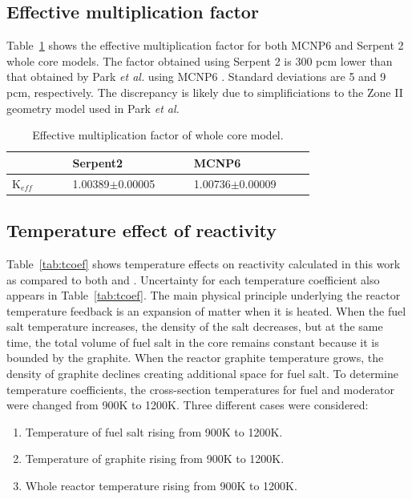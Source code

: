 \documentclass{anstrans}
\begin{document}
\subsection{Effective multiplication factor}
Table~\ref{tab:keff} shows the effective multiplication factor for both MCNP6 
and Serpent 2 whole core models. The factor obtained using Serpent 2 is 300 pcm 
lower than that obtained by Park \emph{et al.} using MCNP6 
\cite{park_whole_2015}. Standard deviations are 5 and 9 pcm, respectively. The 
discrepancy is likely due to simplificiations to the Zone II geometry model 
used in Park \emph{et al.}
\captionsetup[table]{
  labelsep = newline,
  name = TABLE, justification=justified,
  singlelinecheck=false,%
  labelsep=colon,%
  skip = \medskipamount}
\begin{table}[h!]
\caption{Effective multiplication factor of whole core model.}
\begin{tabular}{p{0.15\linewidth} p{0.3\linewidth} p{0.3\linewidth}} \toprule
      & Serpent2      & MCNP6 \cite{park_whole_2015}          \\ \midrule
K$_{eff}$  & 1.00389$\pm$0.00005 & 1.00736$\pm$0.00009
\\
\bottomrule
\end{tabular}
  \label{tab:keff}
\end{table}
\subsection{Temperature effect of reactivity}
Table~\ref{tab:tcoef} shows temperature effects on reactivity calculated in 
this work as compared to both \cite{park_whole_2015} and 
\cite{robertson_conceptual_1971}. Uncertainty for each temperature coefficient 
also appears in Table~\ref{tab:tcoef}. The main physical principle underlying 
the reactor temperature feedback is an expansion of matter when it is heated.  
When the fuel salt temperature increases, the density of the salt decreases, 
but at the same time, the total volume of fuel salt in the core remains 
constant because it is bounded by the graphite. When the reactor graphite 
temperature grows, the density of graphite declines creating additional space 
for fuel salt. To determine temperature coefficients, the cross-section 
temperatures for fuel and moderator were changed from 900K to 1200K. Three 
different cases were considered:
\begin{enumerate}  \item Temperature of fuel salt rising from 900K to 1200K.
\item Temperature of graphite rising from 900K to 1200K.  \item Whole reactor 
        temperature rising from 900K to 1200K.
\end{enumerate}
\end{document}
